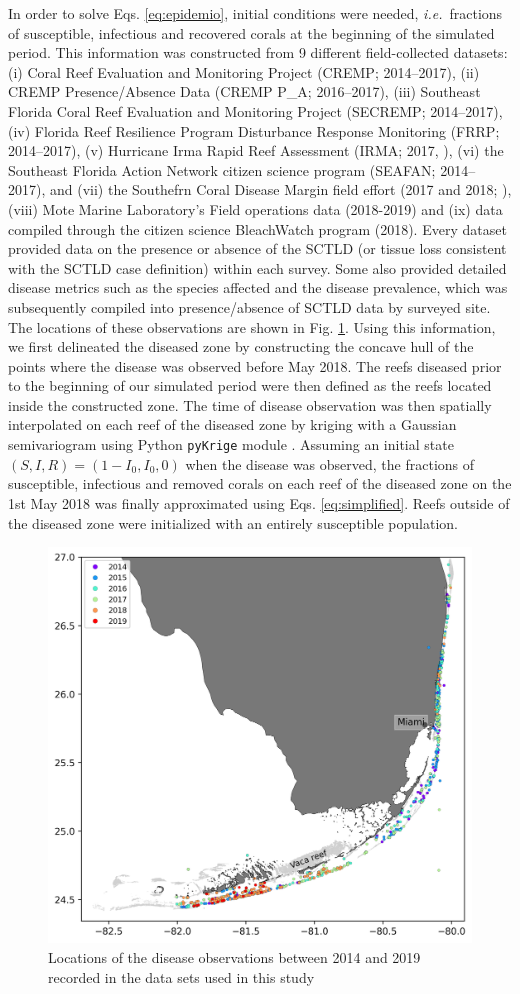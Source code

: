 \documentclass[utf8]{frontiersSCNS}
\newcommand{\ie}{{\it i.e.}\ }
\begin{document}
In order to solve Eqs. \ref{eq:epidemio}, initial conditions were needed, \ie fractions of susceptible, infectious and recovered corals at the beginning of the simulated period. This information was constructed from 9 different field-collected datasets: (i) Coral Reef Evaluation and Monitoring Project (CREMP; 2014–2017), (ii) CREMP Presence/Absence Data (CREMP P\_A; 2016–2017), (iii) Southeast Florida Coral Reef Evaluation and Monitoring Project (SECREMP; 2014–2017), (iv) Florida Reef Resilience Program Disturbance Response Monitoring (FRRP; 2014–2017), (v) Hurricane Irma Rapid Reef Assessment (IRMA; 2017, \cite{viehman2018}), (vi) the Southeast Florida Action Network citizen science program (SEAFAN; 2014–2017), and (vii) the Southefrn Coral Disease Margin field effort (2017 and 2018; \cite{neely2018surveying}), (viii) Mote Marine Laboratory’s Field operations data (2018-2019) and (ix) data compiled through the citizen science BleachWatch program (2018). Every dataset provided data on the presence or absence of the SCTLD (or tissue loss consistent with the SCTLD case definition) within each survey. Some also provided detailed disease metrics such as the species affected and the disease prevalence, which was subsequently compiled into presence/absence of SCTLD data by surveyed site. The locations of these observations are shown in Fig. \ref{fig:stns}. Using this information, we first delineated the diseased zone by constructing the concave hull of the points where the disease was observed before May 2018. The reefs diseased prior to the beginning of our simulated period were then defined as the reefs located inside the constructed zone. The time of disease observation was then spatially interpolated on each reef of the diseased zone by kriging with a Gaussian semivariogram using Python \texttt{pyKrige} module \citep{murphy2014pykrige}. Assuming an initial state $(S,I,R)=(1-I_0, I_0, 0)$ when the disease was observed, the fractions of susceptible, infectious and removed corals on each reef of the diseased zone on the 1st May 2018 was finally approximated using Eqs. \ref{eq:simplified}. Reefs outside of the diseased zone were initialized with an entirely susceptible population.  

\begin{figure}
    \center
    \includegraphics[width=.6\textwidth]{figures/monitoring.png}
    \caption{Locations of the disease observations between 2014 and 2019 recorded in the data sets used in this study}
    \label{fig:stns}
\end{figure}
\end{document}
